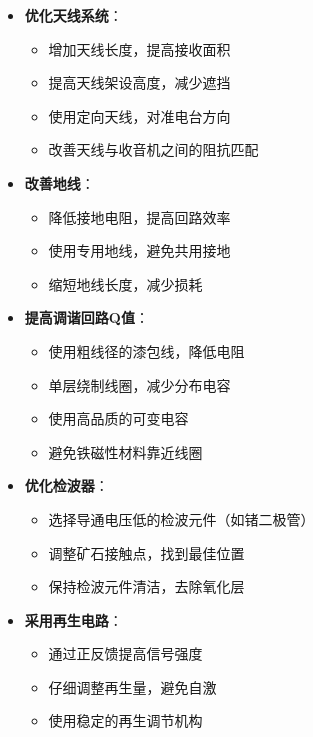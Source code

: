 \documentclass[12pt,UTF8]{ctexbook}
\begin{document}
\begin{itemize}[leftmargin=3.5em]
    \item \textbf{优化天线系统}：
        \begin{itemize}[leftmargin=3.5em]
            \item 增加天线长度，提高接收面积
            \item 提高天线架设高度，减少遮挡
            \item 使用定向天线，对准电台方向
            \item 改善天线与收音机之间的阻抗匹配
        \end{itemize}
    \item \textbf{改善地线}：
        \begin{itemize}[leftmargin=3.5em]
            \item 降低接地电阻，提高回路效率
            \item 使用专用地线，避免共用接地
            \item 缩短地线长度，减少损耗
        \end{itemize}
    \item \textbf{提高调谐回路Q值}：
        \begin{itemize}[leftmargin=3.5em]
            \item 使用粗线径的漆包线，降低电阻
            \item 单层绕制线圈，减少分布电容
            \item 使用高品质的可变电容
            \item 避免铁磁性材料靠近线圈
        \end{itemize}
    \item \textbf{优化检波器}：
        \begin{itemize}[leftmargin=3.5em]
            \item 选择导通电压低的检波元件（如锗二极管）
            \item 调整矿石接触点，找到最佳位置
            \item 保持检波元件清洁，去除氧化层
        \end{itemize}
    \item \textbf{采用再生电路}：
        \begin{itemize}[leftmargin=3.5em]
            \item 通过正反馈提高信号强度
            \item 仔细调整再生量，避免自激
            \item 使用稳定的再生调节机构
        \end{itemize}
\end{itemize}
\end{document}
